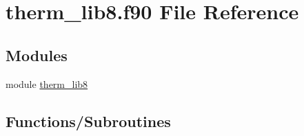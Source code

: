 \hypertarget{therm__lib8_8f90}{}\section{therm\+\_\+lib8.\+f90 File Reference}
\label{therm__lib8_8f90}
\subsection*{Modules}
\begin{DoxyCompactItemize}
\item 
module \hyperlink{namespacetherm__lib8}{therm\+\_\+lib8}
\end{DoxyCompactItemize}
\subsection*{Functions/\+Subroutines}
